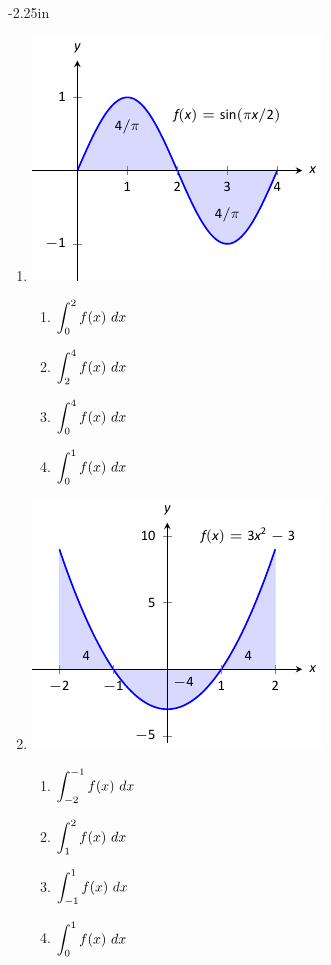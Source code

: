 \begin{adjustwidth*}{}{-2.25in}
\setlength{\columnsep}{25pt}
\begin{multicols*}{2}\small

\begin{enumerate}[1),start=11]
\item \noindent
\begin{minipage}{\linewidth}
\includegraphics[scale=.8]{figures/fig05_02_ex_11}
\end{minipage}
\bmtwo
\begin{enumerate}
\item		$\displaystyle \int_0^2 f(x)\ dx$
\item		$\displaystyle \int_2^4 f(x)\ dx$
\item		$\displaystyle \int_0^4 f(x)\ dx$
\item		$\displaystyle \int_0^1 f(x)\ dx$
\end{enumerate}
\emtwo

\item \noindent
\begin{minipage}{\linewidth}
\includegraphics[scale=.8]{figures/fig05_02_ex_12}
\end{minipage}
\bmtwo
\begin{enumerate}
\item		$\ds \int_{-2}^{-1} f(x)\ dx$
\item		$\displaystyle \int_1^2 f(x)\ dx$
\item		$\ds \int_{-1}^1 f(x)\ dx$
\item		$\displaystyle \int_0^1 f(x)\ dx$
\end{enumerate}
\emtwo


\end{enumerate}
\end{multicols*}
\end{adjustwidth*}
